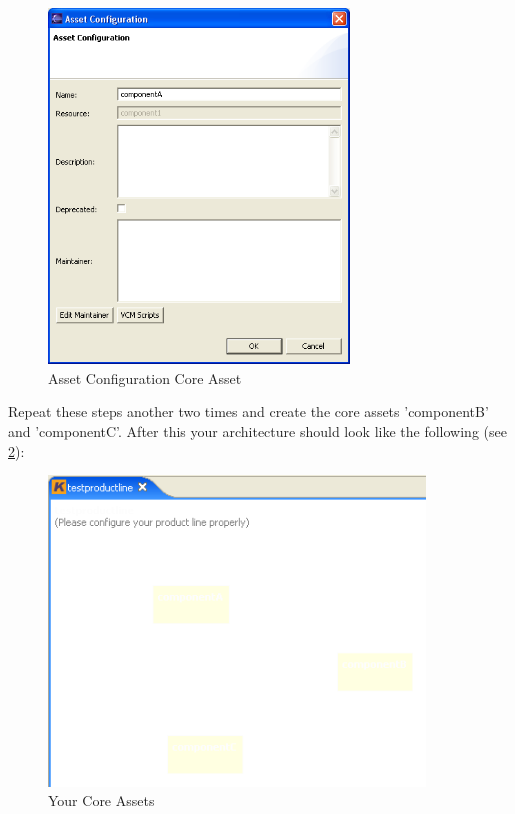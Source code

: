 \begin{figure}[h!]
\begin{center}
\includegraphics[width=8cm]{tutorial7.png}
   \caption{Asset Configuration Core Asset}
   \label{asset1}
\end{center}
\end{figure}\par

Repeat these steps another two times and create the core assets 'componentB' and
'componentC'. After this your architecture should look like the following (see \ref{asset2}):

\begin{figure}[h!]
\begin{center}
\includegraphics[width=10cm]{tutorial8.png}
   \caption{Your Core Assets}
   \label{asset2}
\end{center}
\end{figure}\par


